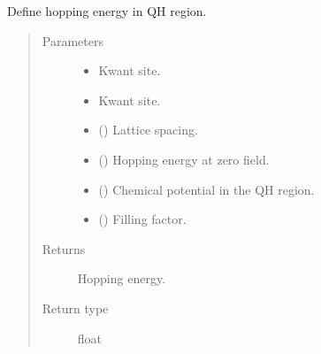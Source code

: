 \documentclass[letterpaper,10pt,english]{sphinxmanual}
\begin{document}

\begin{fulllineitems}
\label{\detokenize{modules:modules.functions.hopping_qh}}
\pysigstartsignatures
{}
\pysigstopsignatures
\sphinxAtStartPar
Define hopping energy in QH region.
\begin{quote}\begin{description}
\item[{Parameters}] \leavevmode\begin{itemize}
\item {} 
\sphinxAtStartPar
{} \textendash{} Kwant site.

\item {} 
\sphinxAtStartPar
{} \textendash{} Kwant site.

\item {} 
\sphinxAtStartPar
{} () \textendash{} Lattice spacing.

\item {} 
\sphinxAtStartPar
{} () \textendash{} Hopping energy at zero field.

\item {} 
\sphinxAtStartPar
{} () \textendash{} Chemical potential in the QH region.

\item {} 
\sphinxAtStartPar
{} () \textendash{} Filling factor.

\end{itemize}

\item[{Returns}] \leavevmode
\sphinxAtStartPar
Hopping energy.

\item[{Return type}] \leavevmode
\sphinxAtStartPar
float

\end{description}\end{quote}

\end{fulllineitems}
\end{document}
